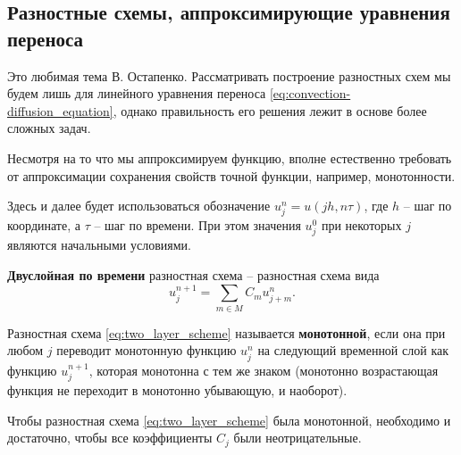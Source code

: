 \documentclass{article}
\begin{document}
\subsection{Разностные схемы, аппроксимирующие уравнения переноса}
Это любимая тема В. Остапенко. Рассматривать построение разностных схем
мы будем лишь для линейного уравнения переноса
\eqref{eq:convection-diffusion_equation}, однако правильность его решения лежит
в основе более сложных задач.

Несмотря на то что мы аппроксимируем функцию, вполне естественно требовать от
аппроксимации сохранения свойств точной функции, например, монотонности.

Здесь и далее будет использоваться обозначение $u_j^n=u(jh,n\tau)$, где $h$ --
шаг по координате, а $\tau$ -- шаг по времени. При этом значения $u^0_j$ при
некоторых $j$ являются начальными условиями.

\begin{define}\label{eq:two_layer_scheme}
	\textbf{Двуслойная по времени} разностная схема -- разностная схема вида
	\[u_j^{n+1}=\sum_{m\in M}C_mu_{j+m}^n.\]
\end{define}

\newpage
\begin{define}\label{eq:monotonic_scheme}
	Разностная схема \eqref{eq:two_layer_scheme} называется
	\textbf{монотонной}, если она при любом $j$ переводит монотонную функцию
	$u_j^n$ на следующий временной слой как функцию $u_j^{n+1}$, которая
	монотонна с тем же знаком (монотонно возрастающая функция не переходит в
	монотонно убывающую, и наоборот).
\end{define}

\begin{theorem}
\label{eq:monotonic_scheme_criterion}
	Чтобы разностная схема \eqref{eq:two_layer_scheme} была монотонной,
	необходимо и достаточно, чтобы все коэффициенты $C_j$ были
	неотрицательные.
\end{theorem}
\end{document}

